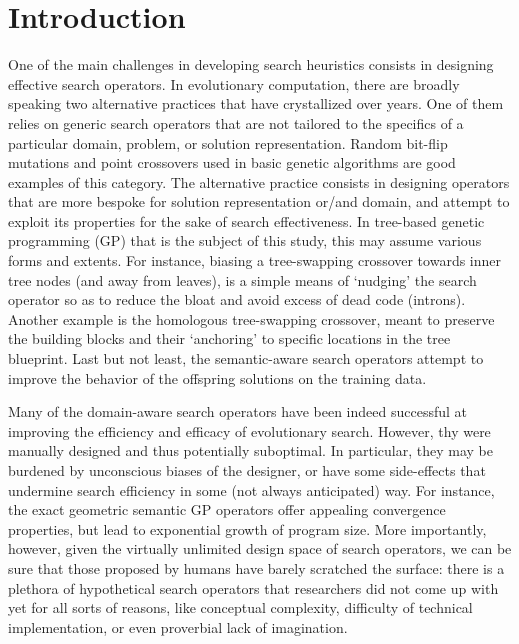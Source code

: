 \section{Introduction}

One of the main challenges in developing search heuristics consists in designing effective search operators. In evolutionary computation, there are broadly speaking two alternative practices that have crystallized over years. One of them relies on generic search operators that are not tailored to the specifics of a particular domain, problem, or solution representation. Random bit-flip mutations and point crossovers used in basic genetic algorithms are good examples of this category. The alternative practice consists in designing operators that are more bespoke for solution representation or/and domain, and attempt to exploit its properties for the sake of search effectiveness. In tree-based genetic programming (GP) that is the subject of this study, this may assume various forms and extents. For instance, biasing a tree-swapping crossover towards inner tree nodes (and away from leaves), is a simple means of `nudging' the search operator so as to reduce the bloat and avoid excess of dead code (introns). Another example is the homologous tree-swapping crossover, meant to preserve the building blocks and their `anchoring' to specific locations in the tree blueprint. Last but not least, the semantic-aware search operators attempt to improve the behavior of the offspring solutions on the training data.  

Many of the domain-aware search operators have been indeed successful at improving the efficiency and efficacy of evolutionary search. However, thy were manually designed and thus potentially suboptimal. In particular, they may be burdened by unconscious biases of the designer, or have some side-effects that undermine search efficiency in some (not always anticipated) way. For instance, the exact geometric semantic GP operators offer appealing convergence properties, but lead to exponential growth of program size. More importantly, however, given the virtually unlimited design space of search operators, we can be sure that those proposed by humans have barely scratched the surface: there is a plethora of hypothetical search operators that researchers did not come up with yet for all sorts of reasons, like conceptual complexity, difficulty of technical implementation, or even proverbial lack of imagination. 

